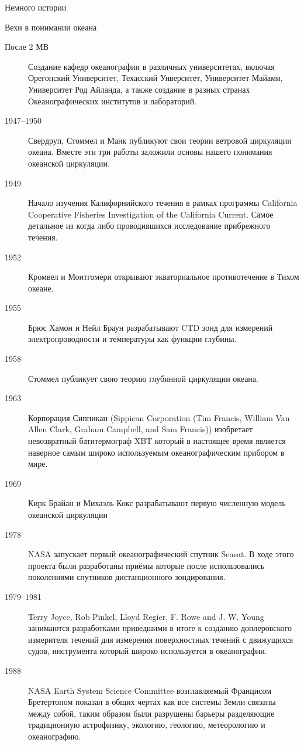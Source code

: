 \begin{chapter}{Немного истории}
\begin{section}{Вехи в понимании океана}
\begin{description}
\item[После 2 МВ] Создание кафедр океанографии в различных
университетах, включая Орегонский Университет, Техасский Унверситет,
Университет Майами, Университет Род Айланда, а также создание в разных
странах Океанографических институтов и лабораторий.

\item[1947--1950] Свердруп, Стоммел и Манк публикуют свои теории
ветровой циркуляции океана. Вместе эти три работы заложили основы
нашего понимания океанской циркуляции.

\item[1949] Начало изучения Калифорнийского течения в рамках программы
California Cooperative Fisheries Investigation of the California
Current. Самое детальное из когда либо проводившихся исследование
прибрежного течения.

\item[1952] Кромвел и Монтгомери открывают экваториальное
противотечение в Тихом океане.

\item[1955] Брюс Хамон и Нейл Браун разрабатывают CTD зонд для
измерений электропроводности и температуры как функции глубины.

\item[1958] Стоммел публикует свою теорию глубинной циркуляции океана.

\item[1963] Корпорация Сиппикан (Sippican Corporation (Tim Francis,
William Van Allen Clark, Graham Campbell, and Sam Francis)) изобретает
невозвратный батитермограф XBT который в настоящее время является
наверное самым широко используемым океанографическим прибором в мире.

\item[1969] Кирк Брайан и Михаэль Кокс разрабатывают первую численную
модель океанской циркуляции

\item[1978] NASA запускает первый океанографический спутник Seasat. В
ходе этого проекта были разработаны приёмы которые после
использовались поколениями спутников дистанционного зондирования.

\item[1979--1981] Terry Joyce, Rob Pinkel, Lloyd Regier, F. Rowe and
J. W. Young занимаются разработками приведшими в итоге к созданию
доплеровского измерителя течений для измерения поверхностных течений с
движущихся судов, инструмента который широко используется в
океанографии.

\item[1988] NASA Earth System Science Committee возглавляемый
Францисом Бретертоном показал в общих чертах как все системы Земли
связаны между собой, таким образом были разрушены барьеры разделяющие
традиционную астрофизику, экологию, геологию, метеорологию и
океанографию.


\end{description}
\end{section}
\end{chapter}
